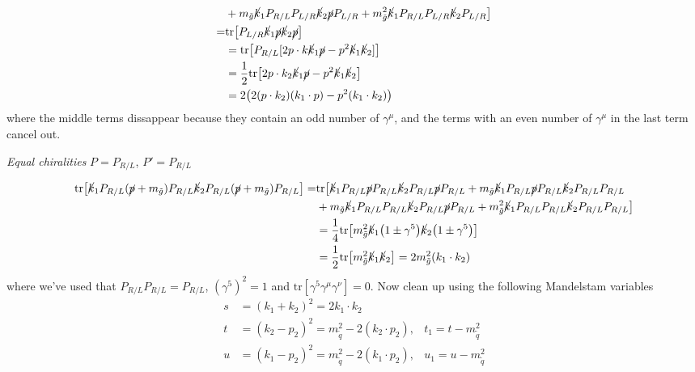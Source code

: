 \documentclass[11pt]{article}
\begin{document}
\begin{flushleft}
\begin{align*}
&+ m_{\tilde{g}} \cancel{k}_1 P_{R/L}  P_{L/R} \cancel{k}_2\cancel{p} P_{L/R}
+ m_{\tilde{g}}^2 \cancel{k}_1 P_{R/L} P_{L/R} \cancel{k}_2  P_{L/R} \big]\\
=& \text{tr} \big[ P_{L/R} 
\cancel{k}_1 \cancel{p} \cancel{k}_2 \cancel{p}  \big]\\
&= \text{tr} \big[
 P_{R/L}[2 p \cdot k \cancel{k}_1 \cancel{p} - p^2\cancel{k}_1 \cancel{k}_2 ]  \big]\\
 &=\frac{1}{2} \text{tr} \big[
2 p \cdot k_2 \cancel{k}_1 \cancel{p} - p^2\cancel{k}_1 \cancel{k}_2 \big]\\
&= 2 \big(
2 (p \cdot k_2) (k_1 \cdot p) - p^2 (k_1 \cdot k_2)\big)
\end{align*}
where the middle terms dissappear because they contain an odd number of $\gamma^{\mu}$, and the terms with an even number of $\gamma^{\mu}$ in the last term cancel out.
\begin{center}
\textit{Equal chiralities} $P=P_{R/L}$, $P'=P_{R/L}$
\end{center}
\begin{align*}
\text{tr} \big[ 
\cancel{k}_1 P_{R/L} (\cancel{p} + m_{\tilde{g}}) P_{R/L} \cancel{k}_2 P_{R/L} (\cancel{p} + m_{\tilde{g}}) P_{R/L} \big]=& \text{tr} \big[ 
\cancel{k}_1 P_{R/L} \cancel{p} P_{R/L} \cancel{k}_2 P_{R/L} \cancel{p}  P_{R/L}
+ m_{\tilde{g}} \cancel{k}_1 P_{R/L} \cancel{p} P_{R/L} \cancel{k}_2 P_{R/L} P_{R/L}\\
&+ m_{\tilde{g}} \cancel{k}_1 P_{R/L}P_{R/L} \cancel{k}_2 P_{R/L} \cancel{p} P_{R/L}
+ m_{\tilde{g}}^2 \cancel{k}_1 P_{R/L}  P_{R/L} \cancel{k}_2 P_{R/L} P_{R/L} \big]\\
&= \frac{1}{4} \text{tr} \big[ m_{\tilde{g}}^2 \cancel{k}_1 \big( 1 \pm \gamma^5 \big) \cancel{k}_2 \big( 1 \pm \gamma^5 \big)\big]\\
&= \frac{1}{2} \text{tr} \big[ m_{\tilde{g}}^2 \cancel{k}_1 \cancel{k}_2\big] = 2  m_{\tilde{g}}^2 (k_1 \cdot k_2)
\end{align*}
where we've used that $P_{R/L}P_{R/L} = P_{R/L}$, $(\gamma^5)^2 = 1$ and $\text{tr}[\gamma^5 \gamma^{\mu} \gamma^{\nu}]=0$. Now clean up using the following Mandelstam variables
\begin{align}
s &= (k_1 + k_2)^2 = 2 k_1 \cdot k_2\\
t &= (k_2-p_2)^2 = m_{\tilde{q}}^2 - 2 (k_2 \cdot p_2), &t_1 = t - m_{\tilde{q}}^2\\
u &= (k_1 - p_2)^2 = m_{\tilde{q}}^2 - 2 (k_1 \cdot p_2),  &u_1 = u - m_{\tilde{q}}^2
\end{align}

\end{flushleft}
\end{document}
